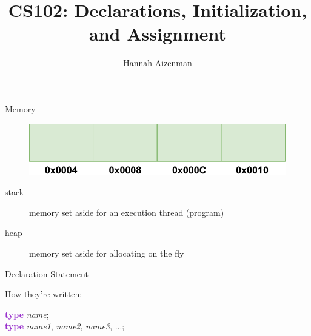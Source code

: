 \documentclass[xcolor={dvipsnames}]{beamer}
\begin{document}
\title{ CS102: Declarations, Initialization, and Assignment }
\author{Hannah Aizenman}

\begin{frame}
	\titlepage
\end{frame}


\begin{frame}{Memory}

\begin{figure}
	\includegraphics[width=1\textwidth]{memory}
\end{figure}


\begin{block}{}
	\begin{description}
		\item[stack] memory set aside for an execution thread (program)
		\item[heap] memory set aside for allocating on the fly
	\end{description}
\end{block}

\end{frame}




\begin{frame}{Declaration Statement}

	\begin{block}{How they're written:}
		\begin{center}
			\textcolor{DarkOrchid}{\textbf{type}} \textit{name};\\
			\pause
			\textcolor{DarkOrchid}{\textbf{type}} \textit{name1}, \textit{name2}, \textit{name3}, ...;
		\end{center}
	\end{block}
\end{frame}
\end{document}
